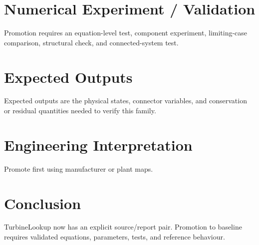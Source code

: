 \documentclass[10pt,a4paper]{article}
\begin{document}
\section{Numerical Experiment / Validation}Promotion requires an equation-level test, component experiment, limiting-case comparison, structural check, and connected-system test.
\section{Expected Outputs}Expected outputs are the physical states, connector variables, and conservation or residual quantities needed to verify this family.
\section{Engineering Interpretation}Promote first using manufacturer or plant maps.
\section*{Conclusion}TurbineLookup now has an explicit source/report pair. Promotion to baseline requires validated equations, parameters, tests, and reference behaviour.
\end{document}
